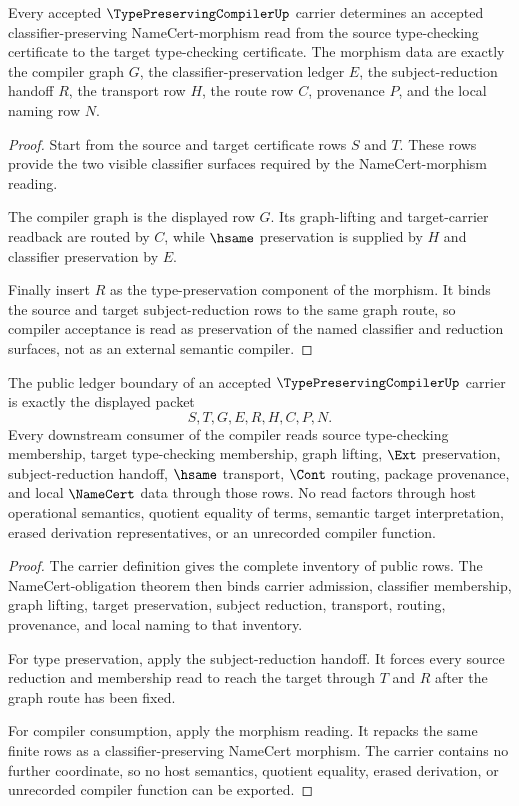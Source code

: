 \begin{theorem}
\label{thm:type-preserving-compiler-morphism-correctness}
Every accepted $\TypePreservingCompilerUp$ carrier determines an accepted classifier-preserving NameCert-morphism read from the source type-checking certificate to the target type-checking certificate. The morphism data are exactly the compiler graph $G$, the classifier-preservation ledger $E$, the subject-reduction handoff $R$, the transport row $H$, the route row $C$, provenance $P$, and the local naming row $N$.
\end{theorem}
\begin{proof}
Start from the source and target certificate rows $S$ and $T$. These rows provide the two visible classifier surfaces required by the NameCert-morphism reading.

The compiler graph is the displayed row $G$. Its graph-lifting and target-carrier readback are routed by $C$, while $\hsame$ preservation is supplied by $H$ and classifier preservation by $E$.

Finally insert $R$ as the type-preservation component of the morphism. It binds the source and target subject-reduction rows to the same graph route, so compiler acceptance is read as preservation of the named classifier and reduction surfaces, not as an external semantic compiler.
\end{proof}

\begin{theorem}
\label{thm:type-preserving-compiler-ledger-boundary}
The public ledger boundary of an accepted $\TypePreservingCompilerUp$ carrier is exactly the displayed packet
$$
S,T,G,E,R,H,C,P,N.
$$
Every downstream consumer of the compiler reads source type-checking membership, target type-checking membership, graph lifting, $\Ext$ preservation, subject-reduction handoff, $\hsame$ transport, $\Cont$ routing, package provenance, and local $\NameCert$ data through those rows. No read factors through host operational semantics, quotient equality of terms, semantic target interpretation, erased derivation representatives, or an unrecorded compiler function.
\end{theorem}
\begin{proof}
The carrier definition gives the complete inventory of public rows. The NameCert-obligation theorem then binds carrier admission, classifier membership, graph lifting, target preservation, subject reduction, transport, routing, provenance, and local naming to that inventory.

For type preservation, apply the subject-reduction handoff. It forces every source reduction and membership read to reach the target through $T$ and $R$ after the graph route has been fixed.

For compiler consumption, apply the morphism reading. It repacks the same finite rows as a classifier-preserving NameCert morphism. The carrier contains no further coordinate, so no host semantics, quotient equality, erased derivation, or unrecorded compiler function can be exported.
\end{proof}

